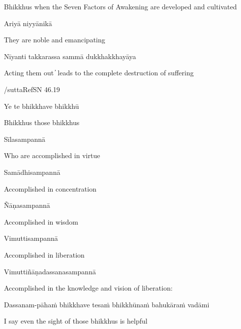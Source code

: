 \begin{cprenglish}
Bhikkhus when the Seven Factors of Awakening are developed and cultivated
\end{cprenglish}

Ariyā niyyānikā

\begin{cprenglish}
They are noble and emancipating
\end{cprenglish}

Nīyanti takkarassa sammā dukkhakkhayāya

\begin{cprenglish}
Acting them out  ̓  leads to the complete destruction of suffering
\end{cprenglish}

/suttaRef{SN 46.19}

Ye te bhikkhave bhikkhū

\begin{cprenglish}
Bhikkhus those bhikkhus
\end{cprenglish}

Sīlasampannā

\begin{cprenglish}
Who are accomplished in virtue
\end{cprenglish}

Samādhisampannā

\begin{cprenglish}
Accomplished in concentration
\end{cprenglish}

Ñāṇasampannā

\begin{cprenglish}
Accomplished in wisdom
\end{cprenglish}

Vimuttisampannā

\begin{cprenglish}
Accomplished in liberation
\end{cprenglish}

Vimuttiñāṇadassanasampannā

\begin{cprenglish}
Accomplished in the knowledge and vision of liberation:
\end{cprenglish}

Dassanam-pāhaṁ bhikkhave tesaṁ bhikkhūnaṁ bahukāraṁ vadāmi

\begin{cprenglish}
I say even the sight of those bhikkhus is helpful
\end{cprenglish}

